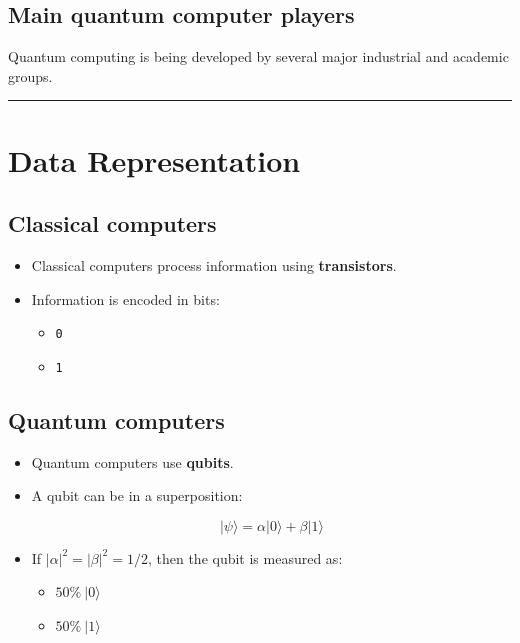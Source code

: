 \documentclass[
]{article}
\providecommand{\tightlist}{%
  \setlength{\itemsep}{0pt}\setlength{\parskip}{0pt}}
\begin{document}
\subsection{Main quantum computer
players}\label{main-quantum-computer-players}

Quantum computing is being developed by several major industrial and
academic groups.

\begin{center}\rule{0.5\linewidth}{0.5pt}\end{center}

\section{Data Representation}\label{data-representation}

\subsection{Classical computers}\label{classical-computers}

\begin{itemize}
\tightlist
\item
  Classical computers process information using \textbf{transistors}.
\item
  Information is encoded in bits:

  \begin{itemize}
  \tightlist
  \item
    \texttt{0}
  \item
    \texttt{1}
  \end{itemize}
\end{itemize}

\subsection{Quantum computers}\label{quantum-computers}

\begin{itemize}
\item
  Quantum computers use \textbf{qubits}.
\item
  A qubit can be in a superposition:

  \[
  |\psi\rangle = \alpha|0\rangle + \beta|1\rangle
  \]
\item
  If $|\alpha|^2 = |\beta|^2 = 1/2$,
  then the qubit is measured as:

  \begin{itemize}
  \tightlist
  \item
    $50\%\ |0\rangle$
  \item
    $50\%\ |1\rangle$
  \end{itemize}
\end{itemize}
\end{document}
